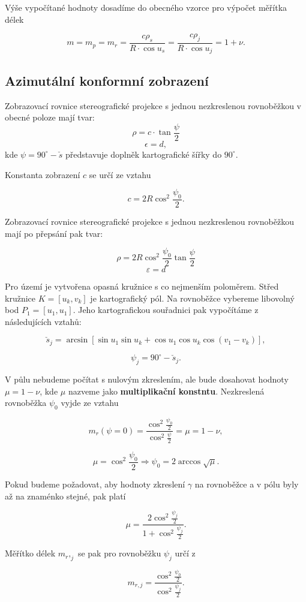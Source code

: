 \documentclass[12pt, a4paper]{article}
\begin{document}
Výše vypočítané hodnoty dosadíme do obecného vzorce pro výpočet měřítka délek

$$m = m_p = m_r = \frac{c \rho_s}{R \cdot \cos u_s} = \frac{c \rho_j}{R \cdot \cos u_j} = 1 + \nu.$$

\subsection{Azimutální konformní zobrazení}
Zobrazovací rovnice stereografické projekce s jednou nezkreslenou rovnoběžkou v obecné poloze mají tvar:
$$\rho = c\cdot\tan\frac{\psi}{2} $$
$$\epsilon = d,$$
kde $\psi = 90^\circ - \check{s}$ představuje doplněk kartografické šířky do $90^\circ$. 

Konstanta zobrazení $c$ se určí ze vztahu 

$$c = 2R \cos^2 \frac{\psi_0}{2}.$$

Zobrazovací rovnice stereografické projekce s jednou nezkreslenou rovnoběžkou mají po přepsání pak tvar:

$$\rho = 2R \cos^2 \frac{\psi_0}{2} \tan \frac{\psi}{2}$$
$$\varepsilon = d$$


Pro území je vytvořena opasná kružnice s co nejmenším poloměrem. Střed kružnice $K = [u_k, v_k]$ je kartografický pól. Na rovnoběžce vybereme libovolný bod $P_1 = [u_1,u_1]$. Jeho kartografickou souřadnici pak vypočítáme z následujících vztahů:

$$ \check{s}_j = \arcsin [\sin u_1 \sin u_k + \cos u_1 \cos u_k \cos(v_1 - v_k)], $$

$$ \psi_j = 90^\circ - \check{s}_j. $$

V půlu nebudeme počítat s nulovým zkreslením, ale bude dosahovat hodnoty $\mu = 1 - \nu$, kde $\mu$ nazveme jako \textbf{multiplikační konstntu}. Nezkreslená rovnoběžka $\psi_0$ vyjde ze vztahu 

$$ m_r(\psi = 0) = \frac{\cos^2 \frac{\psi_0}{2}}{\cos^2 \frac{\psi}{2}} = \mu = 1 - \nu, $$

$$ \mu = \cos^2 \frac{\psi_0}{2} \Rightarrow \psi_0 = 2 \arccos \sqrt{\mu}. $$

Pokud budeme požadovat, aby hodnoty zkreslení $\gamma$ na rovnoběžce a v pólu byly až na znaménko stejné, pak platí 

$$ \mu = \frac{2 \cos^2 \frac{\psi_j}{2}}{1 + \cos^2 \frac{\psi_j}{2}}. $$

Měřítko délek $m_r,_j$ se pak pro rovnoběžku $\psi_j$ určí z

$$ m_{r,j} = \frac{\cos^2 \frac{\psi_0}{2}}{\cos^2 \frac{\psi_j}{2}}.$$
\end{document}
